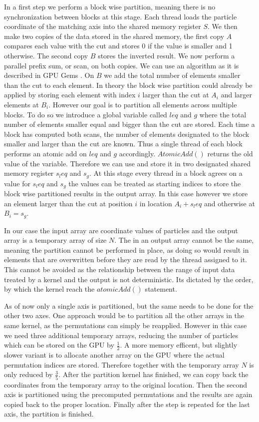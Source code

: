 \documentclass[]{article}
\begin{document}
In a first step we perform a block wise partition, meaning there is no synchronization between blocks at this stage. Each thread loads the particle coordinate of the matching axis into the shared memory register $S$. We then make two copies of the data stored in the shared memory, the first copy $A$ compares each value with the cut and stores 0 if the value is smaller and 1 otherwise. The second copy $B$ stores the inverted result. 
We now perform a parallel prefix sum, or scan, on both copies. We can use an algorithm as it is described in GPU Gems \cite{SCAN}. On $B$ we add the total number of elements smaller than the cut to each element. 
In theory the block wise partition could already be applied by storing each element with index $i$ larger than the cut at $A_i$ and larger elements at $B_i$. 
However our goal is to partition all elements across multiple blocks. To do so we introduce a global variable called $leq$ and $g$ where the total number of elements smaller equal and bigger than the cut are stored. Each time a block has computed both scans, the number of elements designated to the block smaller and larger than the cut are known. Thus a single thread of each block performs an atomic add on $leq$ and $g$ accordingly. $AtomicAdd()$ returns the old value of the variable. Therefore we can use and store it in two designated shared memory register $s_leq$ and $s_g$. 
At this stage every thread in a block agrees on a value for $s_leq$ and $s_g$ the values can be treated as starting indices to store the block wise partitioned results in the output array. In this case however we store an element larger than the cut at position $i$ in location $A_i + s_leq$ and otherwise at $B_i = s_g$. 

In our case the input array are coordinate values of particles and the output array is a temporary array of size $N$. The in an output array cannot be the same, meaning the partition cannot be performed in place, as doing so would result in elements that are overwritten before they are read by the thread assigned to it. This cannot be avoided as the relationship between the range of input data treated by a kernel and the output is not deterministic. Its dictated by the order, by which the kernel reach the $atomicAdd()$ statement. 

As of now only a single axis is partitioned, but the same needs to be done for the other two axes. One approach would be to partition all the other arrays in the same kernel, as the permutations can simply be reapplied. However in this case we need three additional temporary arrays, reducing the number of particles which can be stored on the GPU by $\frac{1}{2}$. A more memory efficent, but slightly slower variant is to allocate another array on the GPU where the actual permutation indices are stored. Therefore together with the temporary array $N$ is only reduced by $\frac{3}{5}$. After the partition kernel has finished, we can copy back the coordinates from the temporary array to the original location. Then the second axis is partitioned using the precomputed permutations and the results are again copied back to the proper location. Finally after the step is repeated for the last axis, the partition is finished.
\end{document}
